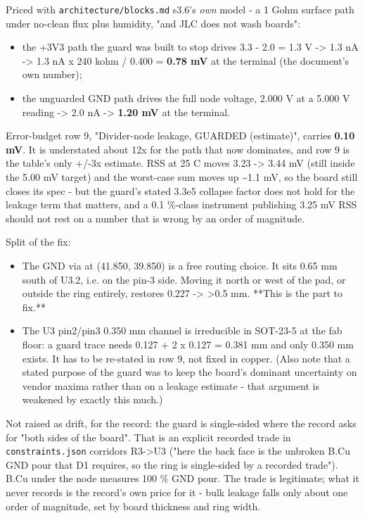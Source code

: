 \documentclass[11pt,a4paper]{article}
\begin{document}
Priced with \texttt{architecture/blocks.md} s3.6's \emph{own} model - a 1 Gohm surface path under no-clean flux plus humidity, "and JLC does not wash boards":

\begin{itemize}
\item the +3V3 path the guard was built to stop drives 3.3 - 2.0 = 1.3 V -\textgreater{}
1.3 nA -\textgreater{} 1.3 nA x 240 kohm / 0.400 = \textbf{0.78 mV} at the terminal (the
document's own number);
\item the unguarded GND path drives the full node voltage, 2.000 V at a 5.000 V
reading -\textgreater{} 2.0 nA -\textgreater{} \textbf{1.20 mV} at the terminal.
\end{itemize}
Error-budget row 9, "Divider-node leakage, GUARDED (estimate)", carries \textbf{0.10 mV}. It is understated about 12x for the path that now dominates, and row 9 is the table's only +/-3x estimate. RSS at 25 C moves 3.23 -\textgreater{} 3.44 mV (still inside the 5.00 mV target) and the worst-case sum moves up \textasciitilde{}1.1 mV, so the board still closes its spec - but the guard's stated 3.3e5 collapse factor does not hold for the leakage term that matters, and a 0.1 \%-class instrument publishing 3.25 mV RSS should not rest on a number that is wrong by an order of magnitude.

Split of the fix:

\begin{itemize}
\item The GND via at (41.850, 39.850) is a free routing choice. It sits 0.65 mm
south of U3.2, i.e. on the pin-3 side. Moving it north or west of the pad, or
outside the ring entirely, restores 0.227 -\textgreater{} \textgreater{}0.5 mm. {*}{*}This is the part to
fix.{*}{*}
\item The U3 pin2/pin3 0.350 mm channel is irreducible in SOT-23-5 at the fab
floor: a guard trace needs 0.127 + 2 x 0.127 = 0.381 mm and only 0.350 mm
exists. It has to be re-stated in row 9, not fixed in copper. (Also note that
a stated purpose of the guard was to keep the board's dominant uncertainty on
vendor maxima rather than on a leakage estimate - that argument is weakened
by exactly this much.)
\end{itemize}
Not raised as drift, for the record: the guard is single-sided where the record asks for "both sides of the board". That is an explicit recorded trade in \texttt{constraints.json} corridors R3-\textgreater{}U3 ("here the back face is the unbroken B.Cu GND pour that D1 requires, so the ring is single-sided by a recorded trade"). B.Cu under the node measures 100 \% GND pour. The trade is legitimate; what it never records is the record's own price for it - bulk leakage falls only about one order of magnitude, set by board thickness and ring width.
\end{document}
